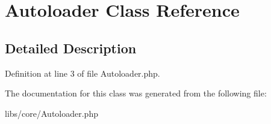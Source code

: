 \hypertarget{class_autoloader}{\section{\-Autoloader \-Class \-Reference}
\label{class_autoloader}
}


\subsection{\-Detailed \-Description}


\-Definition at line 3 of file \-Autoloader.\-php.



\-The documentation for this class was generated from the following file\-:\begin{DoxyCompactItemize}
\item 
libs/core/\-Autoloader.\-php\end{DoxyCompactItemize}
